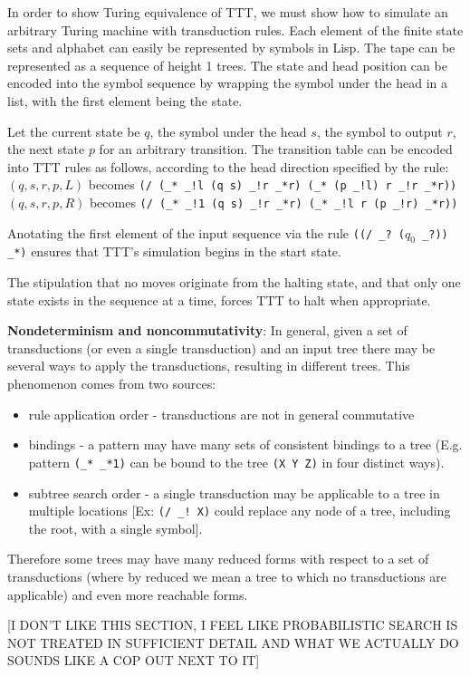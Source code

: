 \documentclass[11pt]{article}
\begin{document}
In order to show Turing equivalence of TTT, we must show how to simulate an arbitrary Turing machine with transduction rules. 
Each element of the finite state sets and alphabet can easily be represented by symbols in Lisp. 
The tape can be represented as a sequence of height 1 trees.  The state and head position can be encoded into the symbol sequence by wrapping the symbol under the head in a list, with the first element being the state. 

Let the current state be $q$, the symbol under the head $s$, the symbol to output $r$, the next state $p$ for an arbitrary transition.  
The transition table can be encoded into TTT rules as follows, according to the head direction specified by the rule: 
$(q,s,r,p,L)$ becomes \texttt{(/ (\_* \_!l (q s) \_!r \_*r) (\_* (p \_!l) r \_!r \_*r))}
$(q,s,r,p,R)$ becomes \texttt{(/ (\_* \_!1 (q s) \_!r \_*r) (\_* \_!l r (p \_!r) \_*r))}

Anotating the first element of the input sequence via the rule \texttt{((/ \_? ($q_0$ \_?)) \_*)} ensures that TTT's simulation begins in the start state.

The stipulation that no moves originate from the halting state, and that only one state exists in the sequence at a time, forces TTT to halt when appropriate.




{\bf Nondeterminism and noncommutativity}:
In general, given a set of transductions (or even a single transduction) and an input tree there may be several ways to apply the transductions, resulting in different trees. This phenomenon comes from two sources:
  \begin{itemize}
  \item rule application order - transductions are not in general commutative
  \item bindings  - a pattern may have many sets of consistent bindings to a tree (E.g. pattern \texttt{(\_* \_*1)} can be bound to the tree \texttt{(X Y Z)} in four distinct ways). 
  \item subtree search order - a single transduction may be applicable to a tree in multiple locations [Ex: \texttt{(/ \_! X)} could replace any node of a tree, including the root, with a single symbol].
  \end{itemize}
  Therefore some trees may have many reduced forms with respect to a set of transductions (where by reduced we mean a tree to which no transductions are applicable) and even more reachable forms. 

  [I DON'T LIKE THIS SECTION, I FEEL LIKE PROBABILISTIC SEARCH IS NOT TREATED IN SUFFICIENT DETAIL AND WHAT WE ACTUALLY DO SOUNDS LIKE A COP OUT NEXT TO IT]
\end{document}
